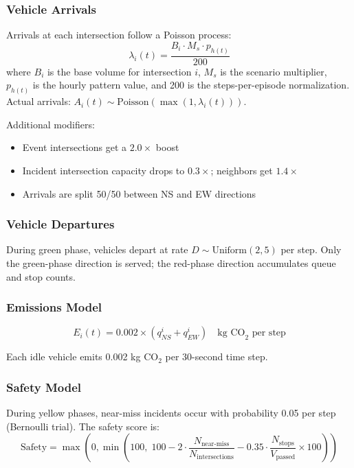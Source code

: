 \documentclass[12pt, a4paper]{article}
\begin{document}
\subsubsection{Vehicle Arrivals}

Arrivals at each intersection follow a Poisson process:
\begin{equation}
    \lambda_i(t) = \frac{B_i \cdot M_s \cdot p_{h(t)}}{200}
\end{equation}
where $B_i$ is the base volume for intersection $i$, $M_s$ is the scenario multiplier, $p_{h(t)}$ is the hourly pattern value, and 200 is the steps-per-episode normalization. Actual arrivals: $A_i(t) \sim \text{Poisson}(\max(1, \lambda_i(t)))$.

Additional modifiers:
\begin{itemize}[nosep]
    \item Event intersections get a $2.0\times$ boost
    \item Incident intersection capacity drops to $0.3\times$; neighbors get $1.4\times$
    \item Arrivals are split 50/50 between NS and EW directions
\end{itemize}

\subsubsection{Vehicle Departures}

During green phase, vehicles depart at rate $D \sim \text{Uniform}(2, 5)$ per step. Only the green-phase direction is served; the red-phase direction accumulates queue and stop counts.

\subsubsection{Emissions Model}

\begin{equation}
    E_i(t) = 0.002 \times (q_{NS}^i + q_{EW}^i) \quad \text{kg CO}_2 \text{ per step}
\end{equation}

Each idle vehicle emits 0.002 kg CO$_2$ per 30-second time step.

\subsubsection{Safety Model}

During yellow phases, near-miss incidents occur with probability 0.05 per step (Bernoulli trial). The safety score is:
\begin{equation}
    \text{Safety} = \max\left(0, \min\left(100,\; 100 - 2 \cdot \frac{N_{\text{near-miss}}}{N_{\text{intersections}}} - 0.35 \cdot \frac{N_{\text{stops}}}{V_{\text{passed}}} \times 100\right)\right)
\end{equation}
\end{document}

